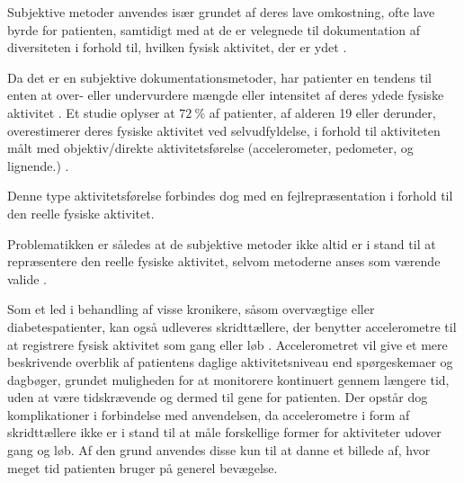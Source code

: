 
Subjektive metoder anvendes især grundet af deres lave omkostning, ofte lave byrde for patienten, samtidigt med at de er velegnede til dokumentation af diversiteten i forhold til, hvilken fysisk aktivitet, der er ydet \citep{adamo2009}.

Da det er en subjektive dokumentationsmetoder, har patienter en tendens til enten at over- eller undervurdere mængde eller intensitet af deres ydede fysiske aktivitet \citep{adamo2009}. 
Et studie oplyser at $72~\%$ af patienter, af alderen 19 eller derunder, overestimerer deres fysiske aktivitet ved selvudfyldelse, i forhold til aktiviteten målt med objektiv/direkte aktivitetsførelse (accelerometer, pedometer, og lignende.) \citep{adamo2009}.

Denne type aktivitetsførelse forbindes dog med en fejlrepræsentation i forhold til den reelle fysiske aktivitet. 

Problematikken er således at de subjektive metoder ikke altid er i stand til at repræsentere den reelle fysiske aktivitet, selvom metoderne anses som værende valide \citep{pedersen2011, motionsraad2007}. 


Som et led i behandling af visse kronikere, såsom overvægtige eller diabetespatienter, kan også udleveres skridttællere, der benytter accelerometre til at registrere fysisk aktivitet som gang eller løb \citep{muller2009, jensen2012, snorgaard2010}. 
Accelerometret vil give et mere beskrivende overblik af patientens daglige aktivitetsniveau end spørgeskemaer og dagbøger, grundet muligheden for at monitorere kontinuert gennem længere tid, uden at være tidskrævende og dermed til gene for patienten. 
Der opstår dog komplikationer i forbindelse med anvendelsen, da accelerometre i form af skridttællere ikke er i stand til at måle forskellige former for aktiviteter udover gang og løb. 
Af den grund anvendes disse kun til at danne et billede af, hvor meget tid patienten bruger på generel bevægelse. \citep{motionsraad2007}